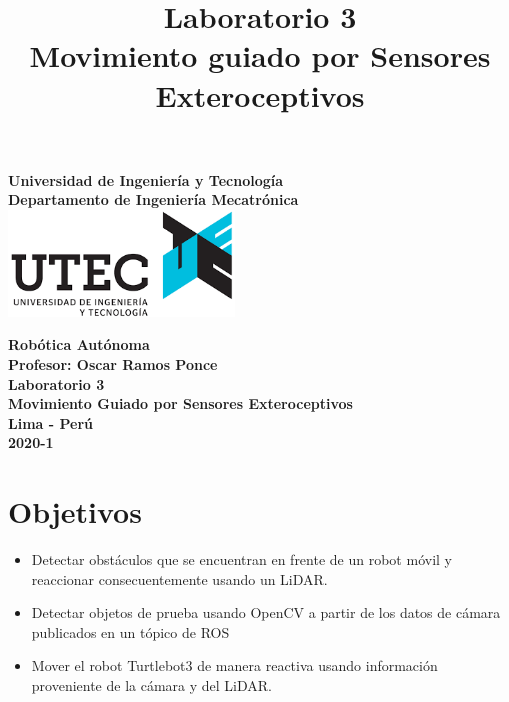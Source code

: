 \documentclass[a4paper,11pt]{robotlabs}
\title{
  \textbf{Laboratorio 3 \\ Movimiento guiado por Sensores Exteroceptivos}
  \date{}
}
\begin{document}

\thispagestyle{empty}
\begin{center}
\textbf{{\huge Universidad de Ingenier\'ia y Tecnolog\'ia}\\ [.5cm]
 {\LARGE Departamento de Ingenier\'ia  Mecatr\'onica}\\[3cm]
}
{\includegraphics[width=6cm]{images/utec}}\\[3cm]
\end{center}

\begin{center}
  {\LARGE \textbf{Robótica Autónoma}}\\[0.8cm]
  {\Large \textbf{Profesor: Oscar Ramos Ponce}}\\[3.0cm]
  {\Large \textbf{Laboratorio 3}}\\[0.5cm]
  {\Large \textbf{Movimiento Guiado por Sensores Exteroceptivos}}\\[4.8cm] %
  {\Large \textbf{Lima - Perú}} \\[0.5cm]
  {\LARGE \textbf{2020-1}}
\end{center}

\newpage
\maketitle
\thispagestyle{fancyplain}


\section{Objetivos}

\begin{itemize}
\item Detectar obstáculos que se encuentran en frente de un robot móvil y
  reaccionar consecuentemente usando un LiDAR.
\item Detectar objetos de prueba usando OpenCV a partir de los datos de cámara
  publicados en un tópico de ROS
\item Mover el robot Turtlebot3 de manera reactiva usando información
  proveniente de la cámara y del LiDAR.
\end{itemize}
\end{document}
